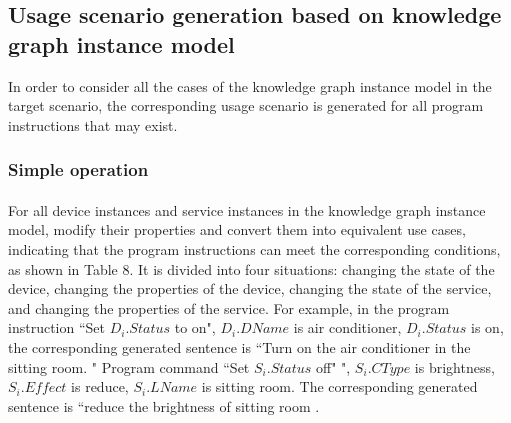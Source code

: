 \subsection{Usage scenario generation based on knowledge graph instance model}
In order to consider all the cases of the knowledge graph instance model in the target scenario, the corresponding usage scenario is generated for all program instructions that may exist.
\subsubsection{Simple operation}
\paragraph{}
For all device instances and service instances in the knowledge graph instance model, modify their properties and convert them into equivalent use cases, indicating that the program instructions can meet the corresponding conditions, as shown in Table 8. It is divided into four situations: changing the state of the device, changing the properties of the device, changing the state of the service, and changing the properties of the service. For example, in the program instruction ``Set $D_{i}.Status$ to on", $D_{i}.DName$ is air conditioner, $D_{i}.Status$ is on, the corresponding generated sentence is ``Turn on the air conditioner in the sitting room. " Program command ``Set $S_{i}.Status$ off" ", $S_{i}.CType$ is brightness, $S_{i}.Effect$ is reduce, $S_{i}.LName$ is sitting room. The corresponding generated sentence is ``reduce the brightness of sitting room . 


